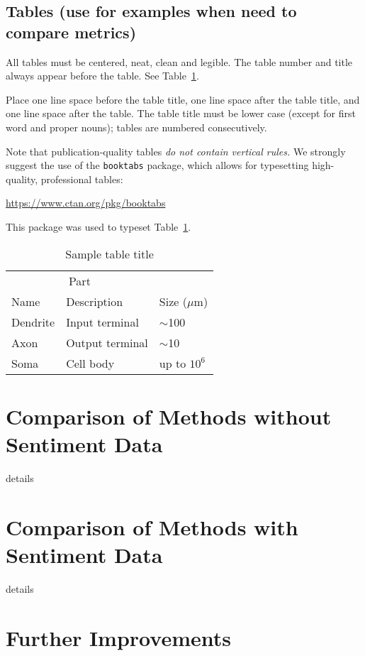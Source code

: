 \documentclass{article}
\begin{document}
\subsection{Tables (use for examples when need to compare metrics)}

All tables must be centered, neat, clean and legible.  The table number and
title always appear before the table.  See Table~\ref{sample-table}.

Place one line space before the table title, one line space after the
table title, and one line space after the table. The table title must
be lower case (except for first word and proper nouns); tables are
numbered consecutively.

Note that publication-quality tables \emph{do not contain vertical rules.} We
strongly suggest the use of the \verb+booktabs+ package, which allows for
typesetting high-quality, professional tables:
\begin{center}
  \url{https://www.ctan.org/pkg/booktabs}
\end{center}
This package was used to typeset Table~\ref{sample-table}.

\begin{table}
  \caption{Sample table title}
  \label{sample-table}
  \centering
  \begin{tabular}{lll}
    \toprule
    \multicolumn{2}{c}{Part}                   \\
    \cmidrule(r){1-2}
    Name     & Description     & Size ($\mu$m) \\
    \midrule
    Dendrite & Input terminal  & $\sim$100     \\
    Axon     & Output terminal & $\sim$10      \\
    Soma     & Cell body       & up to $10^6$  \\
    \bottomrule
  \end{tabular}
\end{table}

\section{Comparison of Methods without Sentiment Data}
details

\section{Comparison of Methods with Sentiment Data}

details

\section{Further Improvements}
\end{document}
